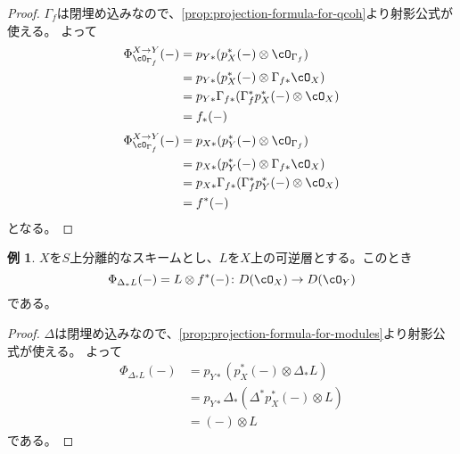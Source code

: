 \documentclass[uplatex, a4paper, dvipdfmx]{jsarticle}
\theoremstyle{definition}
\newtheorem{example}[theorem]{例}
\begin{document}
\begin{proof}
    $\Gamma_f$は閉埋め込みなので、\ref{prop:projection-formula-for-qcoh}より射影公式が使える。
    よって
    \begin{align}
        \Phi_{\cO_{\Gamma_f}}^{X \to Y}(-) & = p_{Y*}(p_X^*(-) \otimes \cO_{\Gamma_f})               \\
                                           & = p_{Y*}(p_X^*(-) \otimes \Gamma_{f*}\cO_X)             \\
                                           & = p_{Y*}\Gamma_{f*}(\Gamma_{f}^*p_X^*(-) \otimes \cO_X) \\
                                           & = f_*(-)
    \end{align}
    \begin{align}
        \Phi_{\cO_{\Gamma_f}}^{X \to Y}(-) & = p_{X*}(p_Y^*(-) \otimes \cO_{\Gamma_f})               \\
                                           & = p_{X*}(p_Y^*(-) \otimes \Gamma_{f*}\cO_X)             \\
                                           & = p_{X*}\Gamma_{f*}(\Gamma_{f}^*p_Y^*(-) \otimes \cO_X) \\
                                           & = f^*(-)
    \end{align}
    となる。
\end{proof}
\begin{example}\label{ex:line-bundle-as-Fourier-Mukai}
    $X$を$S$上分離的なスキームとし、$L$を$X$上の可逆層とする。このとき
    \begin{equation}
        \Phi_{\Delta_*L}(-) = L \otimes f^*(-) \colon D(\cO_X) \to D(\cO_Y)
    \end{equation}
    である。
\end{example}
\begin{proof}
    $\Delta$は閉埋め込みなので、\ref{prop:projection-formula-for-modules}より射影公式が使える。
    よって
    \begin{align}
        \Phi_{\Delta_*L}(-) & = p_{Y*}(p_X^*(-) \otimes \Delta_* L)        \\
                            & = p_{Y*}\Delta_*(\Delta^*p_X^*(-) \otimes L) \\
                            & = (-) \otimes L
    \end{align}
    である。
\end{proof}
\end{document}

